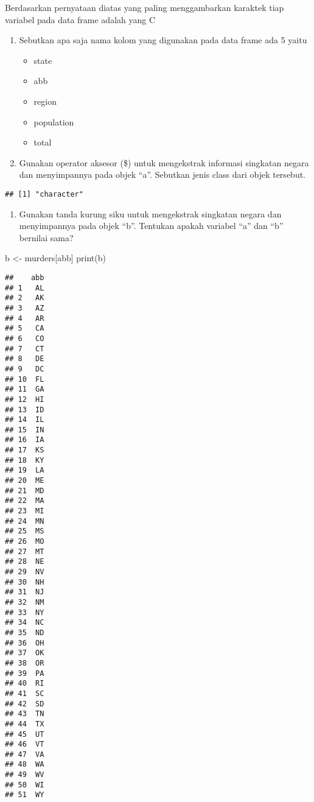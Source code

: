 \documentclass[
]{article}
\newenvironment{Shaded}{\begin{snugshade}}{\end{snugshade}}
\newcommand{\FunctionTok}[1]{\textcolor[rgb]{0.00,0.00,0.00}{#1}}
\newcommand{\NormalTok}[1]{#1}
\newcommand{\OtherTok}[1]{\textcolor[rgb]{0.56,0.35,0.01}{#1}}
\newcommand{\SpecialCharTok}[1]{\textcolor[rgb]{0.00,0.00,0.00}{#1}}
\newcommand{\StringTok}[1]{\textcolor[rgb]{0.31,0.60,0.02}{#1}}
\providecommand{\tightlist}{%
  \setlength{\itemsep}{0pt}\setlength{\parskip}{0pt}}
\begin{document}
Berdasarkan pernyataan diatas yang paling menggambarkan karaktek tiap
variabel pada data frame adalah yang C

\begin{enumerate}
\def\labelenumi{\arabic{enumi}.}
\setcounter{enumi}{1}
\tightlist
\item
  Sebutkan apa saja nama kolom yang digunakan pada data frame ada 5
  yaitu

  \begin{itemize}
  \tightlist
  \item
    state
  \item
    abb
  \item
    region
  \item
    population
  \item
    total
  \end{itemize}
\item
  Gunakan operator aksesor (\$) untuk mengekstrak informasi singkatan
  negara dan menyimpannya pada objek ``a''. Sebutkan jenis class dari
  objek tersebut.
\end{enumerate}

\begin{Shaded}
\end{Shaded}

\begin{verbatim}
## [1] "character"
\end{verbatim}

\begin{enumerate}
\def\labelenumi{\arabic{enumi}.}
\setcounter{enumi}{3}
\tightlist
\item
  Gunakan tanda kurung siku untuk mengekstrak singkatan negara dan
  menyimpannya pada objek ``b''. Tentukan apakah variabel ``a'' dan
  ``b'' bernilai sama?
\end{enumerate}

\begin{Shaded}
\begin{Highlighting}[]
\NormalTok{b }\OtherTok{\textless{}{-}}\NormalTok{ murders[}\StringTok{\textquotesingle{}abb\textquotesingle{}}\NormalTok{]}
\FunctionTok{print}\NormalTok{(b)}
\end{Highlighting}
\end{Shaded}

\begin{verbatim}
##    abb
## 1   AL
## 2   AK
## 3   AZ
## 4   AR
## 5   CA
## 6   CO
## 7   CT
## 8   DE
## 9   DC
## 10  FL
## 11  GA
## 12  HI
## 13  ID
## 14  IL
## 15  IN
## 16  IA
## 17  KS
## 18  KY
## 19  LA
## 20  ME
## 21  MD
## 22  MA
## 23  MI
## 24  MN
## 25  MS
## 26  MO
## 27  MT
## 28  NE
## 29  NV
## 30  NH
## 31  NJ
## 32  NM
## 33  NY
## 34  NC
## 35  ND
## 36  OH
## 37  OK
## 38  OR
## 39  PA
## 40  RI
## 41  SC
## 42  SD
## 43  TN
## 44  TX
## 45  UT
## 46  VT
## 47  VA
## 48  WA
## 49  WV
## 50  WI
## 51  WY
\end{verbatim}
\end{document}

